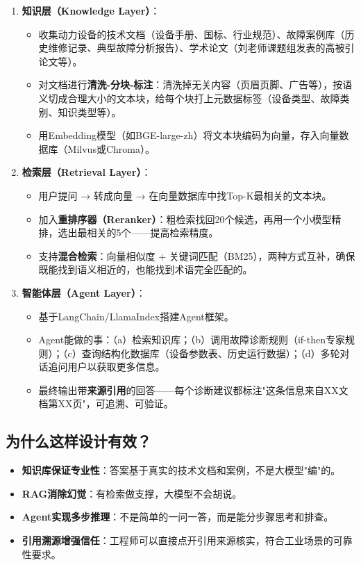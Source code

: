 \documentclass[a4paper, 11pt]{ctexart}
\begin{document}
\begin{enumerate}
    \item \textbf{知识层（Knowledge Layer）}：
    \begin{itemize}
        \item 收集动力设备的技术文档（设备手册、国标、行业规范）、故障案例库（历史维修记录、典型故障分析报告）、学术论文（刘老师课题组发表的高被引论文等）。
        \item 对文档进行\textbf{清洗-分块-标注}：清洗掉无关内容（页眉页脚、广告等），按语义切成合理大小的文本块，给每个块打上元数据标签（设备类型、故障类别、知识类型等）。
        \item 用Embedding模型（如BGE-large-zh）将文本块编码为向量，存入向量数据库（Milvus或Chroma）。
    \end{itemize}

    \item \textbf{检索层（Retrieval Layer）}：
    \begin{itemize}
        \item 用户提问 → 转成向量 → 在向量数据库中找Top-K最相关的文本块。
        \item 加入\textbf{重排序器（Reranker）}：粗检索找回20个候选，再用一个小模型精排，选出最相关的5个——提高检索精度。
        \item 支持\textbf{混合检索}：向量相似度 + 关键词匹配（BM25），两种方式互补，确保既能找到语义相近的，也能找到术语完全匹配的。
    \end{itemize}

    \item \textbf{智能体层（Agent Layer）}：
    \begin{itemize}
        \item 基于LangChain/LlamaIndex搭建Agent框架。
        \item Agent能做的事：（a）检索知识库；（b）调用故障诊断规则（if-then专家规则）；（c）查询结构化数据库（设备参数表、历史运行数据）；（d）多轮对话追问用户以获取更多信息。
        \item 最终输出带\textbf{来源引用}的回答——每个诊断建议都标注"这条信息来自XX文档第XX页"，可追溯、可验证。
    \end{itemize}
\end{enumerate}

\subsection{为什么这样设计有效？}

\begin{itemize}
    \item \textbf{知识库保证专业性}：答案基于真实的技术文档和案例，不是大模型"编"的。
    \item \textbf{RAG消除幻觉}：有检索做支撑，大模型不会胡说。
    \item \textbf{Agent实现多步推理}：不是简单的一问一答，而是能分步骤思考和排查。
    \item \textbf{引用溯源增强信任}：工程师可以直接点开引用来源核实，符合工业场景的可靠性要求。
\end{itemize}
\end{document}
